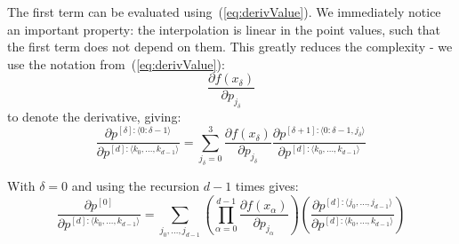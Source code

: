 \documentclass[11pt]{article}
\begin{document}
The first term can be evaluated using~(\ref{eq:derivValue}). We immediately notice an important property: the interpolation is linear in the point values, such that the first term does not depend on them. This greatly reduces the complexity - we use the notation from~(\ref{eq:derivValue}):
\begin{equation}
\frac{ 
\partial f(x_\delta)
}{
\partial p_{j_\delta}
}
\end{equation}
to denote the derivative, giving:
\begin{equation}
\frac{\partial p^{[\delta]: \langle 0:\delta-1 \rangle} }{\partial p^{[d]: \langle k_0, \dots, k_{d-1} \rangle}} 
= 
\sum_{j_\delta=0}^3 
\frac{
\partial f(x_\delta)
}{
\partial p_{j_\delta}
}
\frac{\partial p^{[\delta+1]: \langle 0:\delta-1,j_\delta \rangle}
}{
\partial p^{[d]: \langle k_0, \dots, k_{d-1} \rangle}
}
\label{eq:recDerivP}
\end{equation}

With $\delta=0$ and using the recursion $d-1$ times gives:
\begin{equation}
\frac{\partial p^{[0]}}{\partial p^{[d]: \langle k_0, \dots, k_{d-1} \rangle}}
=
\sum_{j_0,\dots,j_{d-1}} 
\left (
\prod_{\alpha=0}^{d-1} 
\frac{
\partial f(x_\alpha)
}{
\partial p_{j_\alpha}
}
\right ) 
\left (
\frac{
\partial p^{[d]: \langle j_0, \dots, j_{d-1} \rangle}
}{
\partial p^{[d]: \langle k_0, \dots, k_{d-1} \rangle}
}
\right )
\end{equation}
\end{document}
